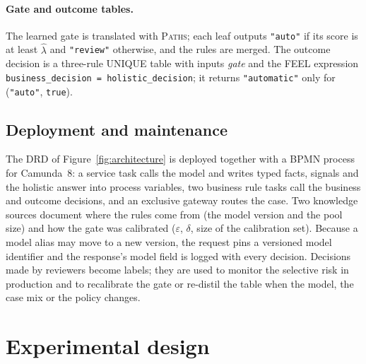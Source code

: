 \documentclass[a4paper,fleqn]{cas-sc}
\theoremstyle{definition}
\newcommand{\feel}[1]{\texttt{#1}}
\begin{document}
\paragraph{Gate and outcome tables.} The learned gate is translated with \textsc{Paths}; each leaf outputs \feel{"auto"} if its score is at least $\hat\lambda$ and \feel{"review"} otherwise, and the rules are merged. The outcome decision is a three-rule UNIQUE table with inputs \emph{gate} and the FEEL expression \feel{business\_decision = holistic\_decision}; it returns \feel{"automatic"} only for (\feel{"auto"}, \feel{true}).

\subsection{Deployment and maintenance}
The DRD of Figure~\ref{fig:architecture} is deployed together with a BPMN process for Camunda~8: a service task calls the model and writes typed facts, signals and the holistic answer into process variables, two business rule tasks call the business and outcome decisions, and an exclusive gateway routes the case. Two knowledge sources document where the rules come from (the model version and the pool size) and how the gate was calibrated ($\varepsilon$, $\delta$, size of the calibration set). Because a model alias may move to a new version, the request pins a versioned model identifier and the response's model field is logged with every decision. Decisions made by reviewers become labels; they are used to monitor the selective risk in production and to recalibrate the gate or re-distil the table when the model, the case mix or the policy changes.

\section{Experimental design}\label{sec:design}
\end{document}
